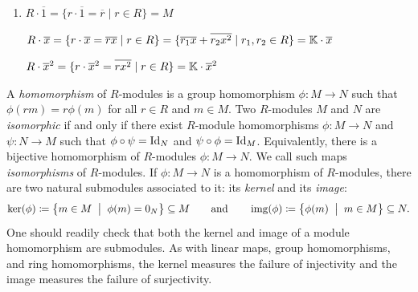 \documentclass[Notebook.tex]{subfiles}
\begin{document}
\begin{solution}
\begin{enumerate}
            Consider $\Z/12\Z \cdot \overline{6}$, 
            \[\Z/12\Z \cdot \overline{6} = \{r \cdot \overline{6} \mid r \in \Z /12\Z\} = \{\overline{0}, \overline{6}\}\]

            \item $R \cdot \overline{1} = \{r \cdot \overline{1} = \overline{r} \mid r \in R\} =  M$
            
            $R \cdot \overline{x} = \{r \cdot \overline{x} = \overline{rx} \mid r \in R\} =  \{\overline{r_1 x} + \overline{r_2 x^2} \mid r_1, r_2 \in R\} = \mathbb K \cdot \overline{x}$

            $R \cdot \overline{x}^2 = \{r \cdot \overline{x}^2 = \overline{rx^2} \mid r \in R\} = \mathbb K \cdot \overline{x}^2$
        \end{enumerate}
    \end{solution}

    \newpage 

    \hrulefill

    A \emph{homomorphism} of $R$-modules is a group homomorphism $\phi:M \to N$ such that $\phi(rm)=r\phi(m)$ for all $r\in R$ and $m\in M$. Two $R$-modules $M$ and $N$ are \emph{isomorphic} if and only if there exist $R$-module homomorphisms $\phi:M \to N$ and $\psi:N\to M$ such that $\phi\circ \psi = \operatorname{Id}_{N}$ and $\psi\circ \phi=\operatorname{Id}_{M}$. Equivalently, there is a bijective homomorphism of $R$-modules $\phi:M\to N$. We call such maps \emph{isomorphisms} of $R$-modules.  If $\phi:M \to N$ is a homomorphism of $R$-modules, there are two natural submodules associated to it: its \emph{kernel} and its \emph{image}:
    \[
    \ker(\phi) \coloneqq \left\{ m \in M \;\; \big| \;\; \phi(m)=0_{N} \right\}\subseteq M \quad \quad \text{and} \quad \quad \operatorname{img}(\phi) \coloneqq \left\{ \phi(m) \;\; \big| \;\; m \in M\right\} \subseteq N.
    \]
    One should readily check that both the kernel and image of a module homomorphism are submodules. As with linear maps, group homomorphisms, and ring homomorphisms, the kernel measures the failure of injectivity and the image measures the failure of surjectivity.
\end{document}
